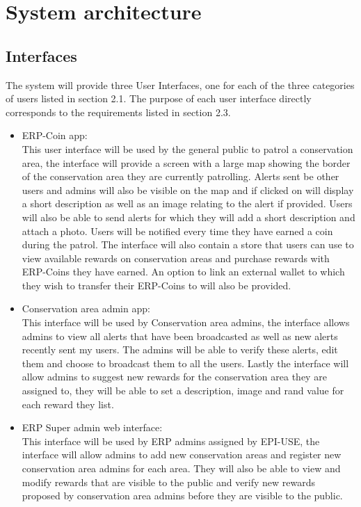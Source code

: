 \documentclass{article}
\begin{document}
\section{System architecture}

\subsection{Interfaces}
 
\def\sectionautorefname{UI}
The system will provide three User Interfaces, one for each of the three categories of users listed in section 2.1. The purpose of each user interface directly corresponds to the requirements listed in section 2.3.

\begin{itemize}
\item ERP-Coin app:\\
This user interface will be used by the general public to patrol a conservation area, the interface will provide a screen with a large map showing the border of the conservation area they are currently patrolling. Alerts sent be other users and admins will also be visible on the map and if clicked on will display a short description as well as an image relating to the alert if provided. Users will also be able to send alerts for which they will add a short description and attach a photo. Users will be notified every time they have earned a coin during the patrol. The interface will also contain a store that users can use to view available rewards on conservation areas and purchase rewards with ERP-Coins they have earned. An option to link an external wallet to which they wish to transfer their ERP-Coins to will also be provided.\\

\item Conservation area admin app:\\
This interface will be used by Conservation area admins, the interface allows admins to view all alerts that have been broadcasted as well as new alerts recently sent my users. The admins will be able to verify these alerts, edit them and choose to broadcast them to all the users. Lastly the interface will allow admins to suggest new rewards for the conservation area they are assigned to, they will be able to set a description, image and rand value for each reward they list.

\item ERP Super admin web interface:\\
This interface will be used by ERP admins assigned by EPI-USE, the interface will allow admins to add new conservation areas and register new conservation area admins for each area. They will also be able to view and modify rewards that are visible to the public and verify new rewards proposed by conservation area admins before they are visible to the public.
\end{itemize}
\end{document}
